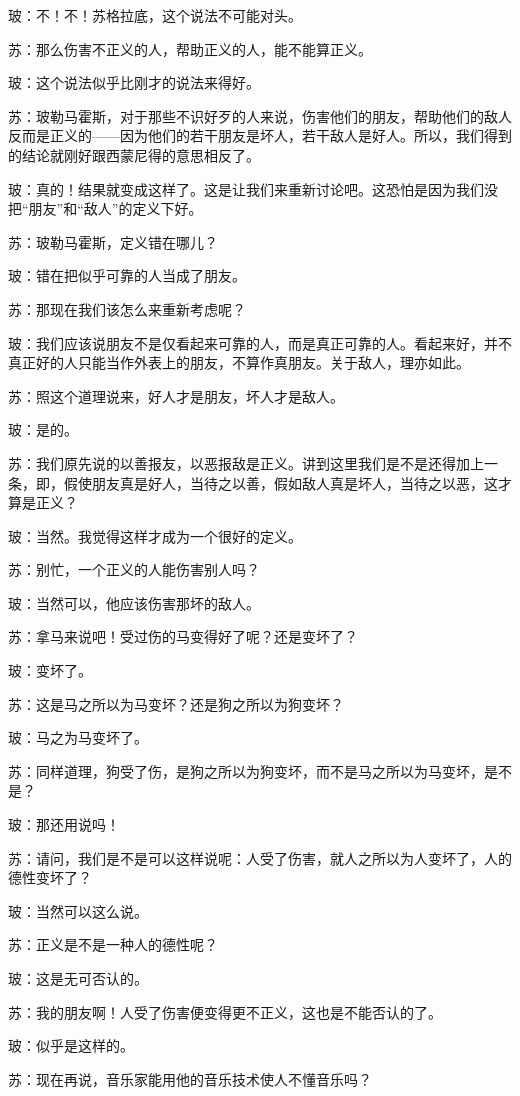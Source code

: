 \documentclass[12pt,oneside]{book}
\begin{document}
玻：不！不！苏格拉底，这个说法不可能对头。

苏：那么伤害不正义的人，帮助正义的人，能不能算正义。

玻：这个说法似乎比刚才的说法来得好。

苏：玻勒马霍斯，对于那些不识好歹的人来说，伤害他们的朋友，帮助他们的敌人反而是正义的——因为他们的若干朋友是坏人，若干敌人是好人。所以，我们得到的结论就刚好跟西蒙尼得的意思相反了。

玻：真的！结果就变成这样了。这是让我们来重新讨论吧。这恐怕是因为我们没把“朋友”和“敌人”的定义下好。

苏：玻勒马霍斯，定义错在哪儿？

玻：错在把似乎可靠的人当成了朋友。

苏：那现在我们该怎么来重新考虑呢？

玻：我们应该说朋友不是仅看起来可靠的人，而是真正可靠的人。看起来好，并不真正好的人只能当作外表上的朋友，不算作真朋友。关于敌人，理亦如此。

苏：照这个道理说来，好人才是朋友，坏人才是敌人。

玻：是的。

苏：我们原先说的以善报友，以恶报敌是正义。讲到这里我们是不是还得加上一条，即，假使朋友真是好人，当待之以善，假如敌人真是坏人，当待之以恶，这才算是正义？

玻：当然。我觉得这样才成为一个很好的定义。

苏：别忙，一个正义的人能伤害别人吗？

玻：当然可以，他应该伤害那坏的敌人。

苏：拿马来说吧！受过伤的马变得好了呢？还是变坏了？

玻：变坏了。

苏：这是马之所以为马变坏？还是狗之所以为狗变坏？

玻：马之为马变坏了。

苏：同样道理，狗受了伤，是狗之所以为狗变坏，而不是马之所以为马变坏，是不是？

玻：那还用说吗！

苏：请问，我们是不是可以这样说呢：人受了伤害，就人之所以为人变坏了，人的德性变坏了？

玻：当然可以这么说。

苏：正义是不是一种人的德性呢？

玻：这是无可否认的。

苏：我的朋友啊！人受了伤害便变得更不正义，这也是不能否认的了。

玻：似乎是这样的。

苏：现在再说，音乐家能用他的音乐技术使人不懂音乐吗？
\end{document}
